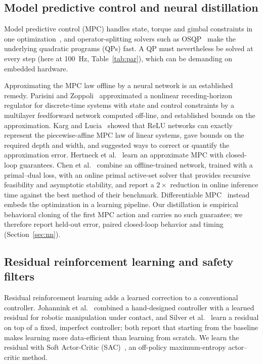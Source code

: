 \documentclass[preprint,12pt,authoryear=false]{elsarticle}
\theoremstyle{remark}\newtheorem{remark}{Remark}
\theoremstyle{plain}\newtheorem{proposition}{Proposition}\newtheorem{lemma}{Lemma}
\theoremstyle{definition}\newtheorem{assumption}{Assumption}
\begin{document}
\subsection{Model predictive control and neural distillation}
Model predictive control (MPC) handles state, torque and gimbal constraints in one optimization~\cite{rawlings2017model}, and operator-splitting solvers such as OSQP~\cite{stellato2020osqp} make the underlying quadratic programs (QPs) fast. A QP must nevertheless be solved at every step (here at \SI{100}{\hertz}, Table~\ref{tab:par}), which can be demanding on embedded hardware.

Approximating the MPC law offline by a neural network is an established remedy. Parisini and Zoppoli~\cite{parisini1995neural} approximated a nonlinear receding-horizon regulator for discrete-time systems with state and control constraints by a multilayer feedforward network computed off-line, and established bounds on the approximation. Karg and Lucia~\cite{karg2020efficient} showed that ReLU networks can exactly represent the piecewise-affine MPC law of linear systems, gave bounds on the required depth and width, and suggested ways to correct or quantify the approximation error. Hertneck et al.~\cite{hertneck2018learning} learn an approximate MPC with closed-loop guarantees. Chen et al.~\cite{chen2022large} combine an offline-trained network, trained with a primal--dual loss, with an online primal active-set solver that provides recursive feasibility and asymptotic stability, and report a $2\times$ reduction in online inference time against the best method of their benchmark. Differentiable MPC~\cite{amos2018differentiable} instead embeds the optimization in a learning pipeline. Our distillation is empirical behavioral cloning of the first MPC action and carries no such guarantee; we therefore report held-out error, paired closed-loop behavior and timing (Section~\ref{sec:nn}).

\subsection{Residual reinforcement learning and safety filters}
Residual reinforcement learning adds a learned correction to a conventional controller. Johannink et al.~\cite{johannink2019residual} combined a hand-designed controller with a learned residual for robotic manipulation under contact, and Silver et al.~\cite{silver2018residual} learn a residual on top of a fixed, imperfect controller; both report that starting from the baseline makes learning more data-efficient than learning from scratch. We learn the residual with Soft Actor-Critic (SAC)~\cite{haarnoja2018soft,haarnoja2018softapps}, an off-policy maximum-entropy actor--critic method.
\end{document}
